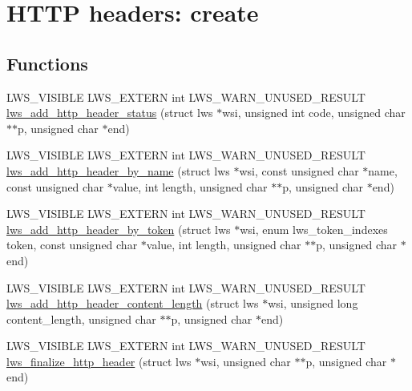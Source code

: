 \hypertarget{group__HTTP-headers-create}{}\section{H\+T\+TP headers\+: create}
\label{group__HTTP-headers-create}
\subsection*{Functions}
\begin{DoxyCompactItemize}
\item 
L\+W\+S\+\_\+\+V\+I\+S\+I\+B\+LE L\+W\+S\+\_\+\+E\+X\+T\+E\+RN int L\+W\+S\+\_\+\+W\+A\+R\+N\+\_\+\+U\+N\+U\+S\+E\+D\+\_\+\+R\+E\+S\+U\+LT \hyperlink{group__HTTP-headers-create_ga29b7d6d2ddfdbaff3d8b607e7e3151b6}{lws\+\_\+add\+\_\+http\+\_\+header\+\_\+status} (struct lws $\ast$wsi, unsigned int code, unsigned char $\ast$$\ast$p, unsigned char $\ast$end)
\item 
L\+W\+S\+\_\+\+V\+I\+S\+I\+B\+LE L\+W\+S\+\_\+\+E\+X\+T\+E\+RN int L\+W\+S\+\_\+\+W\+A\+R\+N\+\_\+\+U\+N\+U\+S\+E\+D\+\_\+\+R\+E\+S\+U\+LT \hyperlink{group__HTTP-headers-create_ga2b36bf44405755ff51c1939303b995a8}{lws\+\_\+add\+\_\+http\+\_\+header\+\_\+by\+\_\+name} (struct lws $\ast$wsi, const unsigned char $\ast$name, const unsigned char $\ast$value, int length, unsigned char $\ast$$\ast$p, unsigned char $\ast$end)
\item 
L\+W\+S\+\_\+\+V\+I\+S\+I\+B\+LE L\+W\+S\+\_\+\+E\+X\+T\+E\+RN int L\+W\+S\+\_\+\+W\+A\+R\+N\+\_\+\+U\+N\+U\+S\+E\+D\+\_\+\+R\+E\+S\+U\+LT \hyperlink{group__HTTP-headers-create_gaf74adb761b22566ad70004882712dce1}{lws\+\_\+add\+\_\+http\+\_\+header\+\_\+by\+\_\+token} (struct lws $\ast$wsi, enum lws\+\_\+token\+\_\+indexes token, const unsigned char $\ast$value, int length, unsigned char $\ast$$\ast$p, unsigned char $\ast$end)
\item 
L\+W\+S\+\_\+\+V\+I\+S\+I\+B\+LE L\+W\+S\+\_\+\+E\+X\+T\+E\+RN int L\+W\+S\+\_\+\+W\+A\+R\+N\+\_\+\+U\+N\+U\+S\+E\+D\+\_\+\+R\+E\+S\+U\+LT \hyperlink{group__HTTP-headers-create_gacc76a5babcb4dce1b01b1955aa7a2faf}{lws\+\_\+add\+\_\+http\+\_\+header\+\_\+content\+\_\+length} (struct lws $\ast$wsi, unsigned long content\+\_\+length, unsigned char $\ast$$\ast$p, unsigned char $\ast$end)
\item 
L\+W\+S\+\_\+\+V\+I\+S\+I\+B\+LE L\+W\+S\+\_\+\+E\+X\+T\+E\+RN int L\+W\+S\+\_\+\+W\+A\+R\+N\+\_\+\+U\+N\+U\+S\+E\+D\+\_\+\+R\+E\+S\+U\+LT \hyperlink{group__HTTP-headers-create_ga4887605ff2242a54db3a7fa01f6f864b}{lws\+\_\+finalize\+\_\+http\+\_\+header} (struct lws $\ast$wsi, unsigned char $\ast$$\ast$p, unsigned char $\ast$end)
\end{DoxyCompactItemize}


